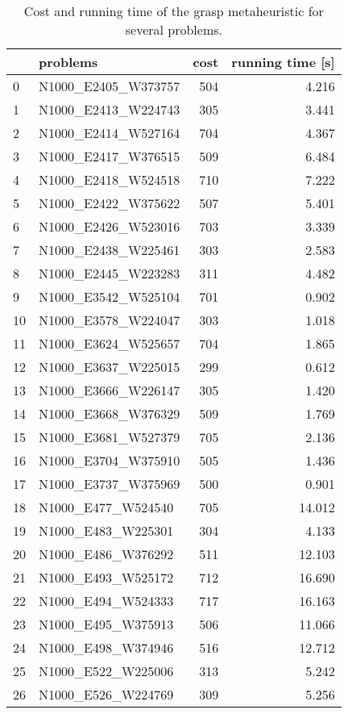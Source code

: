 \begin{table}[H]
\centering
\begin{tabular}{llrr}
\toprule
{} &             problems &  cost &  running time [s] \\
\midrule
0  &  N1000\_E2405\_W373757 &   504 &             4.216 \\
1  &  N1000\_E2413\_W224743 &   305 &             3.441 \\
2  &  N1000\_E2414\_W527164 &   704 &             4.367 \\
3  &  N1000\_E2417\_W376515 &   509 &             6.484 \\
4  &  N1000\_E2418\_W524518 &   710 &             7.222 \\
5  &  N1000\_E2422\_W375622 &   507 &             5.401 \\
6  &  N1000\_E2426\_W523016 &   703 &             3.339 \\
7  &  N1000\_E2438\_W225461 &   303 &             2.583 \\
8  &  N1000\_E2445\_W223283 &   311 &             4.482 \\
9  &  N1000\_E3542\_W525104 &   701 &             0.902 \\
10 &  N1000\_E3578\_W224047 &   303 &             1.018 \\
11 &  N1000\_E3624\_W525657 &   704 &             1.865 \\
12 &  N1000\_E3637\_W225015 &   299 &             0.612 \\
13 &  N1000\_E3666\_W226147 &   305 &             1.420 \\
14 &  N1000\_E3668\_W376329 &   509 &             1.769 \\
15 &  N1000\_E3681\_W527379 &   705 &             2.136 \\
16 &  N1000\_E3704\_W375910 &   505 &             1.436 \\
17 &  N1000\_E3737\_W375969 &   500 &             0.901 \\
18 &   N1000\_E477\_W524540 &   705 &            14.012 \\
19 &   N1000\_E483\_W225301 &   304 &             4.133 \\
20 &   N1000\_E486\_W376292 &   511 &            12.103 \\
21 &   N1000\_E493\_W525172 &   712 &            16.690 \\
22 &   N1000\_E494\_W524333 &   717 &            16.163 \\
23 &   N1000\_E495\_W375913 &   506 &            11.066 \\
24 &   N1000\_E498\_W374946 &   516 &            12.712 \\
25 &   N1000\_E522\_W225006 &   313 &             5.242 \\
26 &   N1000\_E526\_W224769 &   309 &             5.256 \\
\bottomrule
\end{tabular}
\caption{Cost and running time of the grasp metaheuristic for several problems.}
\label{table:grasp-large-results}
\end{table}

